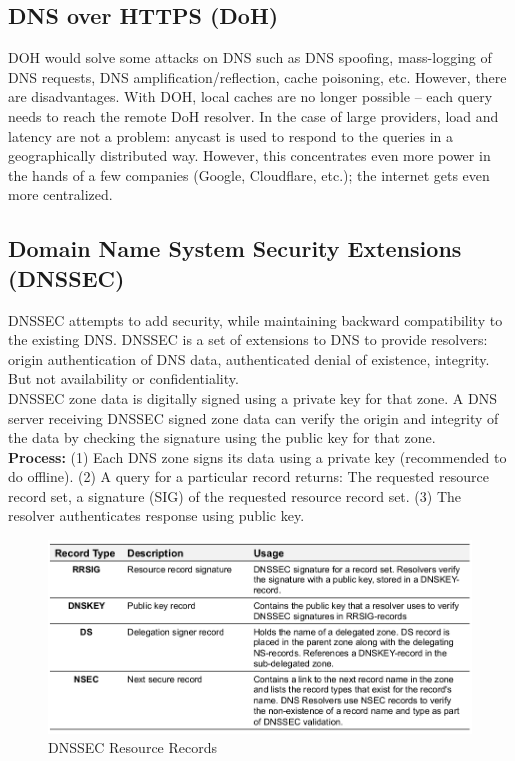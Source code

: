 \documentclass[11pt,oneside,a4paper]{article}
\begin{document}
\subsection{DNS over HTTPS (DoH)}

DOH would solve some attacks on DNS such as DNS spoofing, mass-logging of DNS requests, DNS amplification/reflection, cache poisoning, etc. However, there are disadvantages. With DOH, local caches are no longer possible – each query needs to reach the remote DoH resolver. In the case of large providers, load and latency are not a problem: anycast is used to respond to the queries in a geographically distributed way. However, this concentrates even more power in the hands of a few companies (Google, Cloudflare, etc.); the internet gets even more centralized.

\subsection{Domain Name System Security Extensions (DNSSEC)}

DNSSEC attempts to add security, while maintaining backward compatibility to the
existing DNS. DNSSEC is a set of extensions to DNS to provide resolvers: origin authentication of DNS data, authenticated denial of existence, integrity. But not availability or confidentiality.\\
DNSSEC zone data is digitally signed using a private key for that zone. A DNS server receiving DNSSEC signed zone data can verify the origin and integrity of the data by checking the signature using the public key for that zone.\\
\textbf{Process:} (1) Each DNS zone signs its data using a private key (recommended to do offline). (2) A query for a particular record returns: The requested resource record set, a signature (SIG) of the requested resource record set. (3) The resolver authenticates response using public key.

\begin{figure}[hb]
	\centering
	\includegraphics[width=0.8\linewidth]{figures/dnssec_resource_records}
	\caption{DNSSEC Resource Records}
	\label{fig:dnssecresourcerecords}
\end{figure}
\end{document}
